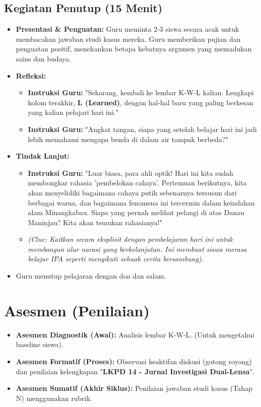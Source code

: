 \documentclass[12pt,a4paper]{article}
\begin{document}
\subsection{Kegiatan Penutup (15 Menit)}
\begin{itemize}
\item \textbf{Presentasi \& Penguatan:} Guru meminta 2-3 siswa secara acak untuk membacakan jawaban studi kasus mereka. Guru memberikan pujian dan penguatan positif, menekankan betapa hebatnya argumen yang memadukan sains dan budaya.
\item \textbf{Refleksi:}
    \begin{itemize}
    \item \textbf{Instruksi Guru:} "Sekarang, kembali ke lembar K-W-L kalian. Lengkapi kolom terakhir, \textbf{L (Learned)}, dengan hal-hal baru yang paling berkesan yang kalian pelajari hari ini."
    \item \textbf{Instruksi Guru:} "Angkat tangan, siapa yang setelah belajar hari ini jadi lebih memahami mengapa benda di dalam air tampak berbeda?"
    \end{itemize}
\item \textbf{Tindak Lanjut:}
    \begin{itemize}
    \item \textbf{Instruksi Guru:} "Luar biasa, para ahli optik! Hari ini kita sudah membongkar rahasia 'pembelokan cahaya'. Pertemuan berikutnya, kita akan menyelidiki bagaimana cahaya putih sebenarnya tersusun dari berbagai warna, dan bagaimana fenomena ini tercermin dalam keindahan alam Minangkabau. Siapa yang pernah melihat pelangi di atas Danau Maninjau? Kita akan temukan rahasianya!"
    \item \textit{(Clue: Kaitkan secara eksplisit dengan pembelajaran hari ini untuk membangun alur narasi yang berkelanjutan. Ini membuat siswa merasa belajar IPA seperti mengikuti sebuah cerita bersambung).}
    \end{itemize}
\item Guru menutup pelajaran dengan doa dan salam.
\end{itemize}

\section{Asesmen (Penilaian)}

\begin{itemize}
\item \textbf{Asesmen Diagnostik (Awal):} Analisis lembar K-W-L. (Untuk mengetahui baseline siswa).
\item \textbf{Asesmen Formatif (Proses):} Observasi keaktifan diskusi (gotong royong) dan penilaian kelengkapan "\textbf{LKPD 14 - Jurnal Investigasi Dual-Lensa}".
\item \textbf{Asesmen Sumatif (Akhir Siklus):} Penilaian jawaban studi kasus (Tahap N) menggunakan rubrik.
\end{itemize}
\end{document}

